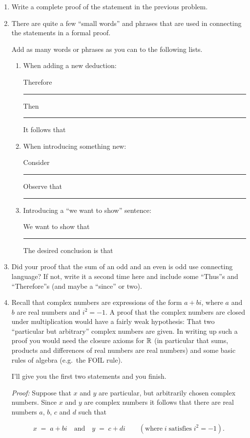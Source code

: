 \documentclass{amsart}
\begin{document}
\begin{enumerate}
\item Write a complete proof of the statement in the previous problem.

\vfill

\vfill

\newpage

\item There are quite a few ``small words'' and phrases that are used in connecting the statements in a formal proof.

Add as many words or phrases as you can to the following lists.

\begin{enumerate}
\item \rule{0pt}{30pt} When adding a new deduction:

Therefore \rule{36pt}{0pt} Then \rule{36pt}{0pt} It follows that 


\item \rule{0pt}{30pt} When introducing something new:

Consider \rule{36pt}{0pt} Observe that \rule{36pt}{0pt} 

\item \rule{0pt}{30pt} Introducing a ``we want to show'' sentence:

We want to show that \rule{36pt}{0pt} The desired conclusion is that 

\end{enumerate}

\vspace{.5in}

\item Did your proof that the sum of an odd and an even is odd use connecting language?  If not, write it a second time here and include some ``Thus''s and ``Therefore''s (and maybe a ``since'' or two).

\vfill

\newpage

\item Recall that complex numbers are expressions of the form $a + bi$, where $a$ and $b$ are real numbers and $i^2 = -1$.  A proof that the complex numbers are closed under multiplication would have a fairly weak hypothesis:  That two ``particular but arbitrary'' complex numbers are given.  In writing up such a proof you would need the closure axioms for ${\mathbb R}$ (in particular that sums, products and differences of real numbers are real numbers) and some basic rules of algebra (e.g.\ the FOIL rule).

I'll give you the first two statements and you finish.

\vspace{.5in}

{\em Proof:} Suppose that $x$ and $y$ are particular, but arbitrarily chosen complex numbers.  Since $x$ and $y$ are complex numbers it follows that there are real numbers $a$, $b$, $c$ and $d$ such that

\[ x \; = \; a+bi \quad \mbox{and} \quad y \; = \; c+di \qquad ( \mbox{where} \; i \; \mbox{satisfies} \; i^2 = -1). \]



\vfill

\end{enumerate}
\end{document}
